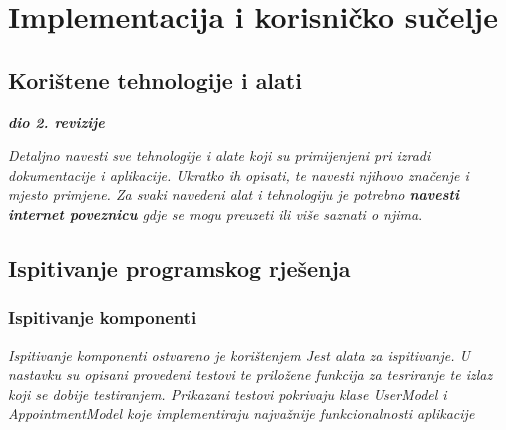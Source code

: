 \chapter{Implementacija i korisničko sučelje}
		
		
		\section{Korištene tehnologije i alati}
		
			\textbf{\textit{dio 2. revizije}}
			
			 \textit{Detaljno navesti sve tehnologije i alate koji su primijenjeni pri izradi dokumentacije i aplikacije. Ukratko ih opisati, te navesti njihovo značenje i mjesto primjene. Za svaki navedeni alat i tehnologiju je potrebno \textbf{navesti internet poveznicu} gdje se mogu preuzeti ili više saznati o njima}.
			
			
			\eject 
		

		\section{Ispitivanje programskog rješenja}
	
			
			\subsection{Ispitivanje komponenti}
			\textit{Ispitivanje komponenti ostvareno je korištenjem Jest alata za ispitivanje. U nastavku su opisani provedeni testovi te priložene funkcija za tesriranje te izlaz koji se dobije testiranjem. Prikazani testovi pokrivaju klase UserModel i AppointmentModel koje implementiraju najvažnije funkcionalnosti aplikacije
                    }
    
